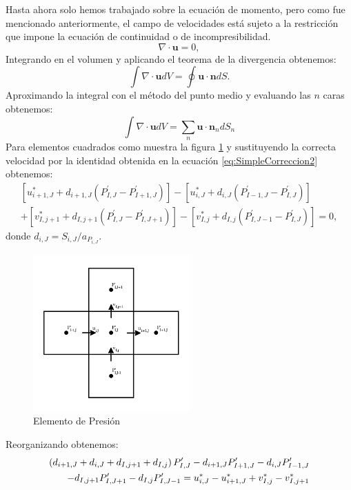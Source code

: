 \documentclass[a4paper,10pt, oneside]{book}
\begin{document}
Hasta ahora solo hemos trabajado sobre la ecuación de momento, pero como fue mencionado anteriormente, el campo de velocidades está sujeto a la restricción que impone la ecuación de continuidad o de incompresibilidad.
\begin{equation}
  \nabla \cdot \textbf{u} = 0,
  \label{eq:continuidadSimple}
\end{equation}
Integrando en el volumen y aplicando el teorema de la divergencia obtenemos:
\begin{equation}
	\int \nabla \cdot \textbf{u} dV = \oint \mathbf{u} \cdot \mathbf{n} dS. \nonumber
\end{equation}
Aproximando la integral con el método del punto medio y evaluando las $n$ caras obtenemos:
\begin{equation}
	\int \nabla \cdot \textbf{u} dV = \sum_n \mathbf{u} \cdot \mathbf{n}_n dS_n
\end{equation}
Para elementos cuadrados como muestra la figura \ref{fig:7-5} y sustituyendo la correcta velocidad por la identidad obtenida en la ecuación \ref{eq:SimpleCorreccion2} obtenemos:
\begin{eqnarray}
   \left[ u_{i+1,J}^* + d_{i+1,J} (P_{I,J}^\prime - P_{I+1,J}^\prime) \right] - \left[ u_{i,J}^*   + d_{i,J} (P_{I-1,J}^\prime - P_{I  ,J}^\prime)  \right] \nonumber \\
 + \left[ v_{I,j+1}^* +d_{I,j+1} (P_{I,J}^\prime   - P_{I,J+1}^\prime) \right] - \left[ v_{I,j}^*   + d_{I,j}(P_{I,J-1}^\prime - P_{I,J  }^\prime) \right] = 0,
\end{eqnarray}
donde $d_{i,J} = S_{i,J} /a_{P_{i,J}}$.
\begin{figure}[h!]
  \centering
  \includegraphics[width=6cm]{Img/7-5}
  \caption{Elemento de Presión}
  \label{fig:7-5}
\end{figure}
Reorganizando obtenemos:
\begin{eqnarray}
 \left( d_{i+1,J} + d_{i,J} + d_{I,j+1} + d_{I,j} \right) P_{I,J}^\prime - d_{i+1,J} P_{I+1,J}^\prime - d_{i,J} P_{I-1,J}^\prime \nonumber \\
- d_{I,j+1} P_{I,J+1}^\prime - d_{I,j} P_{I,J-1}^\prime = u^*_{i,J} - u^*_{i+1,J} + v^*_{I,j} - v^*_{I,j+1}
  \centering \nonumber
\end{eqnarray}
\end{document}
